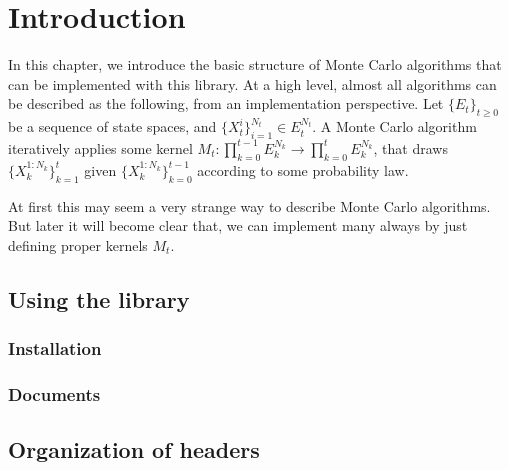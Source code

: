 \chapter{Introduction}
\label{chap:Introduction}

In this chapter, we introduce the basic structure of Monte Carlo algorithms
that can be implemented with this library. At a high level, almost all
algorithms can be described as the following, from an implementation
perspective. Let $\{E_t\}_{t\ge0}$ be a sequence of state spaces, and
$\{X_t^i\}_{i=1}^{N_t} \in E_t^{N_t}$. A Monte Carlo algorithm iteratively
applies some kernel $M_t:\prod_{k=0}^{t-1}E_k^{N_k}\to\prod_{k=0}^tE_k^{N_k}$,
that draws $\{X_k^{1:N_k}\}_{k=1}^t$ given $\{X_k^{1:N_k}\}_{k=0}^{t-1}$
according to some probability law.

At first this may seem a very strange way to describe Monte Carlo algorithms.
But later it will become clear that, we can implement many always by just
defining proper kernels $M_t$.

\section{Using the library}
\label{sec:Using the library}

\subsection{Installation}
\label{sub:Installation}

\subsection{Documents}
\label{sub:Documents}

\section{Organization of headers}
\label{sec:Organization of headers}
